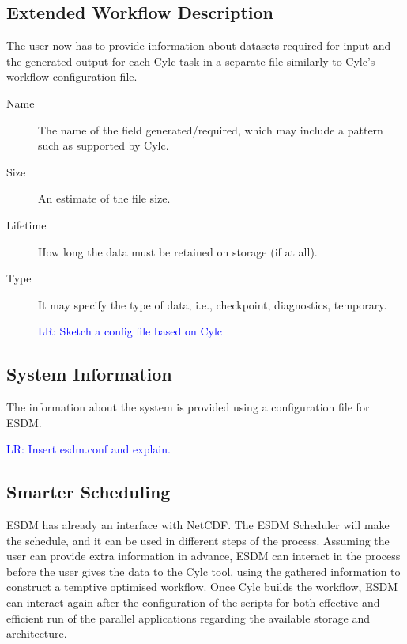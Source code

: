 \documentclass{superfri}
\newcommand{\lr}[1]{\textcolor{blue}{LR: #1}}
\begin{document}
\subsection{Extended Workflow Description}

The user now has to provide information about datasets required for input and the generated output for each Cylc task in a separate file similarly to Cylc's workflow configuration file.

\begin{description}

  \item[Name] The name of the field generated/required, which may include a pattern such as supported by Cylc.

  \item[Size] An estimate of the file size.

  \item[Lifetime] How long the data must be retained on storage (if at all).

  \item[Type] It may specify the type of data, i.e., checkpoint, diagnostics, temporary.

\lr{Sketch a config file based on Cylc}

\end{description}

\subsection{System Information}

The information about the system is provided using a configuration file for ESDM.

\lr{Insert esdm.conf and explain.}

\subsection{Smarter Scheduling}

ESDM has already an interface with NetCDF. The ESDM Scheduler will make the schedule, and it can be used in different steps of the process. Assuming the user can provide extra information in advance, ESDM can interact in the process before the user gives the data to the Cylc tool, using the gathered information to construct a temptive optimised workflow. Once Cylc builds the workflow, ESDM can interact again after the configuration of the scripts for both effective and efficient run of the parallel applications regarding the available storage and architecture.
\end{document}

